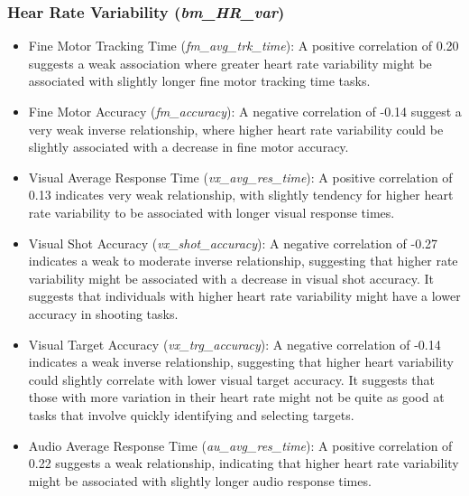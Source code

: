 \subsubsection*{Hear Rate Variability (\textit{bm\_HR\_var})}

\begin{itemize}
    \item Fine Motor Tracking Time (\textit{fm\_avg\_trk\_time}): A positive correlation of 0.20 suggests a weak association where greater heart rate variability 
    might be associated with slightly longer fine motor tracking time tasks.
    
    \item Fine Motor Accuracy (\textit{fm\_accuracy}): A negative correlation of -0.14 suggest a very weak inverse relationship, where higher heart rate variability
    could be slightly associated with a decrease in fine motor accuracy.
    
    \item Visual Average Response Time (\textit{vx\_avg\_res\_time}): A positive correlation of 0.13 indicates very weak relationship, with slightly tendency for
    higher heart rate variability to be associated with longer visual response times. 
    
    \item Visual Shot Accuracy (\textit{vx\_shot\_accuracy}): A negative correlation of -0.27 indicates a weak to moderate inverse relationship, suggesting that
    higher rate variability might be associated with a decrease in visual shot accuracy. It suggests that individuals with higher heart rate variability might 
    have a lower accuracy in shooting tasks.
    
    \item Visual Target Accuracy (\textit{vx\_trg\_accuracy}): A negative correlation of -0.14 indicates a weak inverse relationship, suggesting that higher heart 
    variability could slightly correlate with lower visual target accuracy. It suggests that those with more variation in their heart rate might not be quite as good 
    at tasks that involve quickly identifying and selecting targets.
    
    \item Audio Average Response Time (\textit{au\_avg\_res\_time}): A positive correlation of 0.22 suggests a weak relationship, indicating that higher heart rate
    variability might be associated with slightly longer audio response times.
    
\end{itemize}



